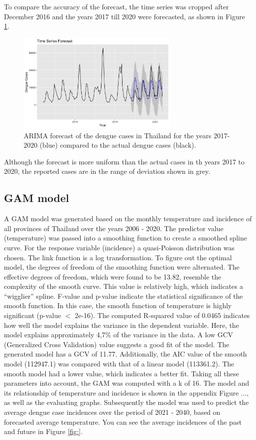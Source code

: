 	To compare the accuracy of the forecast, the time series was cropped after December 2016 and the years 2017 till 2020 were forecasted, as shown in Figure \ref{fig:Auto_ARIMA_2016}. 
		\begin{figure}[hbpt] 
		\centering
		\includegraphics[width=0.7\textwidth]{fig/Auto_ARIMA_2016.png}
		\caption{ARIMA forecast of the dengue cases in Thailand for the years 2017-2020 (blue) compared to the actual dengue cases (black).}
		\label{fig:Auto_ARIMA_2016}
	\end{figure}

Although the forecast is more uniform than the actual cases in th years 2017 to 2020, the reported cases are in the range of deviation shown in grey. 

\subsection{GAM model}
A GAM model was generated based on the monthly temperature and incidence of all provinces of Thailand over the years 2006 - 2020. The predictor value (temperature) was passed into a smoothing function to create a smoothed spline curve. For the response variable (incidence) a quasi-Poisson distribution was chosen. The link function is a log transformation.
To figure out the optimal model, the degrees of freedom of the smoothing function were alternated. The effective degrees of freedom, which were found to be 13.82, resemble the complexity of the smooth curve. This value is relatively high, which indicates a “wigglier” spline. F-value and p-value indicate the statistical significance of the smooth function. In this case, the smooth function of temperature is highly significant (p-value $<$ 2e-16). The computed R-squared value of 0.0465 indicates how well the model explains the variance in the dependent variable. Here, the model explains approximately 4,7\% of the variance in the data. A low GCV (Generalized Cross Validation) value suggests a good fit of the model. The generated model has a GCV of 11.77. Additionally, the AIC value of the smooth model (112947.1) was compared with that of a linear model (113361.2). The smooth model had a lower value, which indicates a better fit.
Taking all these parameters into account, the GAM was computed with a k of 16. The model and its relationship of temperature and incidence is shown in the appendix Figure ..., as well as the evaluating graphs.
Subsequently the model was used to predict the average dengue case incidences over the period of 2021 - 2040, based on forecasted average temperature. You can see the average incidences of the past and future in Figure \ref{fig:}.
